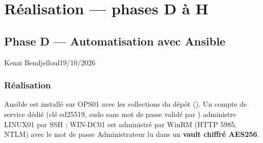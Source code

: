 \chapter{Réalisation — phases D à H}\label{chap:phases-dh}

\section{Phase D — Automatisation avec Ansible}\label{sec:phase-d}

      {Kenzi Bendjelloul}{19/10/2026}{\fait}

\subsection{Réalisation}

Ansible est installé sur OPS01 avec les collections du dépôt ().
Un compte de service  dédié (clé ed25519, sudo sans mot de passe validé par
) administre LINUX01 par SSH ; WIN-DC01 est administré par WinRM (HTTP 5985, NTLM)
avec le mot de passe Administrateur lu dans un \textbf{vault chiffré AES256}.

